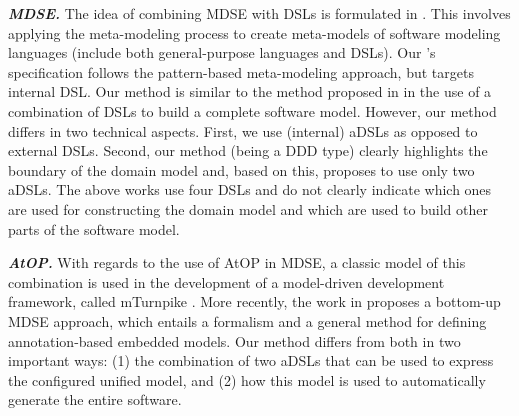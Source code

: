 \textbf{\textit{MDSE.}}
The idea of combining MDSE with DSLs is formulated in \cite{kleppe_software_2008, brambilla_model-driven_2012}. This involves applying the meta-modeling process to create meta-models of software modeling languages (include both general-purpose languages and DSLs). 
Our \agl's specification follows the pattern-based meta-modeling approach, but targets internal DSL.
%
Our method is similar to the method proposed in \cite{warmer_model_2007, warmer_building_2006} in the use of a combination of DSLs to build a complete software model. 
%
However, our method differs in two technical aspects. 
First, we use (internal) aDSLs as opposed to external DSLs. Second, our method (being a DDD type) clearly highlights the boundary of the domain model and, based on this, proposes to use only two aDSLs. The above works use four DSLs and do not clearly indicate which ones are used for constructing the domain model and which are used to build other parts of the software model. 


\textbf{\textit{AtOP.}} With regards to the use of AtOP in MDSE, a classic model of this combination is used in the development of a model-driven development framework, called mTurnpike \cite{wada_modeling_2005}. 
%
More recently, the work in \cite{balz_embedding_2012} proposes a bottom-up MDSE approach, which entails a formalism and a general method for defining annotation-based embedded models. 
%
Our method differs from both \cite{wada_modeling_2005,balz_embedding_2012} in two important ways: 
(1) the combination of two aDSLs that can be used to express the configured unified model, and (2) how this model is used to automatically generate the entire software. 